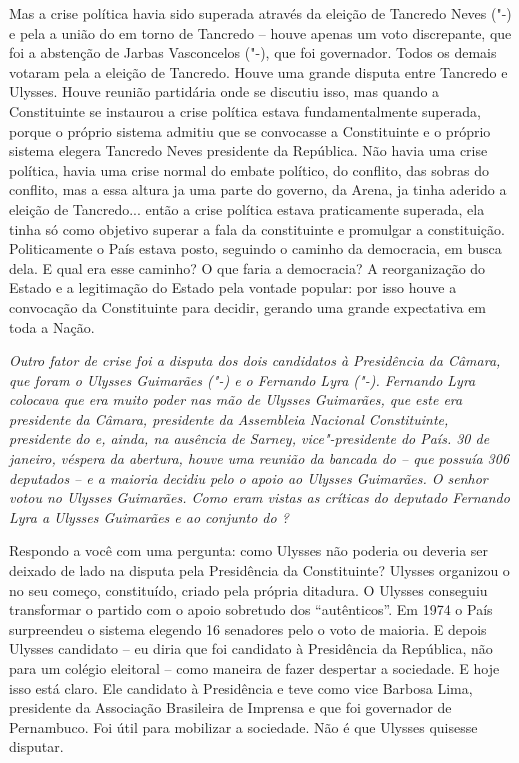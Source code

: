 Mas a crise política havia sido superada através da eleição de Tancredo
Neves ("-) e pela a união do  em torno de Tancredo -- houve
apenas um voto discrepante, que foi a abstenção de Jarbas Vasconcelos
("-), que foi governador. Todos os demais votaram pela a eleição de
Tancredo. Houve uma grande disputa entre Tancredo e Ulysses. Houve
reunião partidária onde se discutiu isso, mas quando a Constituinte se
instaurou a crise política estava fundamentalmente superada, porque o
próprio sistema admitiu que se convocasse a Constituinte e o próprio
sistema elegera Tancredo Neves presidente da República. Não havia uma
crise política, havia uma crise normal do embate político, do conflito,
das sobras do conflito, mas a essa altura ja uma parte do governo, da
Arena, ja tinha aderido a eleição de Tancredo... então a crise política
estava praticamente superada, ela tinha só como objetivo superar a fala
da constituinte e promulgar a constituição. Politicamente o País estava
posto, seguindo o caminho da democracia, em busca dela. E qual era esse
caminho? O que faria a democracia? A reorganização do Estado e a
legitimação do Estado pela vontade popular: por isso houve a convocação
da Constituinte para decidir, gerando uma grande expectativa em toda a
Nação.

\medskip

\noindent\emph{Outro fator de crise foi a disputa dos dois candidatos à
Presidência da Câmara, que foram o Ulysses Guimarães ("-) e o
Fernando Lyra ("-). Fernando Lyra colocava que era muito poder nas
mão de Ulysses Guimarães, que este era presidente da Câmara, presidente
da Assembleia Nacional Constituinte, presidente do  e, ainda, na
ausência de Sarney, vice"-presidente do País. 30 de janeiro,
véspera da abertura, houve uma reunião da bancada do  -- que possuía
306 deputados -- e a maioria decidiu pelo o apoio ao Ulysses Guimarães.
O senhor votou no Ulysses Guimarães. Como eram vistas as críticas do
deputado Fernando Lyra a Ulysses Guimarães e ao conjunto do ?}

Respondo a você com uma pergunta: como Ulysses não
poderia ou deveria ser deixado de lado na disputa pela Presidência da
Constituinte? Ulysses organizou o  no seu começo, constituído, criado
pela própria ditadura. O Ulysses conseguiu transformar o partido com o
apoio sobretudo dos ``autênticos''. Em 1974 o País surpreendeu o sistema
elegendo 16 senadores pelo o voto de maioria. E depois Ulysses candidato
-- eu diria que foi candidato à Presidência da República, não para um
colégio eleitoral -- como maneira de fazer despertar a sociedade. E hoje
isso está claro. Ele candidato à Presidência e teve como vice Barbosa
Lima, presidente da Associação Brasileira de Imprensa e que foi
governador de Pernambuco. Foi útil para mobilizar a sociedade. Não é que
Ulysses quisesse disputar.

